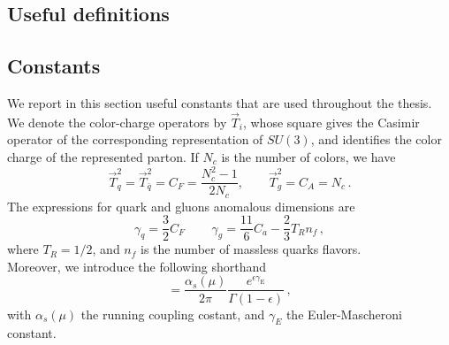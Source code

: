 \documentclass[a4paper, 12pt]{book}
\begin{document}
\begin{appendices}
\pagestyle{append}

\chapter{Useful definitions}

\section{Constants}
We report in this section useful constants that are used throughout the thesis. We denote the color-charge operators by $\vec{T}_i$, whose square gives the Casimir operator of the corresponding representation of $SU(3)$, and identifies the color charge of the represented parton. If $N_c$ is the number of colors, we have
\begin{equation}
  \vec{T}_q^2 = \vec{T}_{\bar{q}}^2 = C_F = \frac{N^2_c -1}{2N_c} , \qquad \vec{T}_g^2=C_A= N_c \, .
  \label{casimir-operators}
\end{equation}
The expressions for quark and gluons anomalous dimensions are 
\begin{equation}
  \gamma_q = \frac{3}{2}C_F \, \qquad \gamma_g = \frac{11}{6}C_a - \frac{2}{3}T_R n_f \, ,
  \label{anomalous-dimension}
\end{equation}
where $T_R=1/2$, and $n_f$ is the number of massless quarks flavors. \\
Moreover, we introduce the following shorthand
\begin{equation}
  [\alpha_s] = \frac{\alpha_s(\mu)}{2\pi} \frac{e^{\epsilon \gamma_{\mathrm{E}}}}{\Gamma(1-\epsilon)} \, ,
  \label{coupling}
\end{equation}
with $\alpha_s(\mu)$ the running coupling costant, and $\gamma_E$ the Euler-Mascheroni constant.


\end{appendices}
\end{document}
